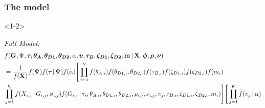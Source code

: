 \begin{frame}[b]
    \frametitle{The \msb model}
    \begin{onlyenv}<1-2>
    \begin{block}{\it Full Model:}
    {\tiny
    \begin{equation*}
        \begin{split}
        & f(\geneTreeVector,
        \numt{},
        \divtvector, \ancestralThetaVector,
        \descendantThetaVector{1}, \descendantThetaVector{2},
        \locusRateHetShapeParameter,
        \locusMutationRateScalarVector,
        \bottleTimeVector, \bottleScalarVector{1},
        \bottleScalarVector{2},
        \migrationRateVector \given
        \alignmentVector, \hkyModelVector, \ploidyScalarVector,
        \mutationRateScalarConstantVector) \\
        & = \frac{1}{f(\alignmentVector)}
        f(\numt{}) f(\divtvector \given \numt{})
        f(\locusRateHetShapeParameter)
        \Bigg[
        \prod_{i=1}^{\npairs{}}
        f(\ancestralTheta{i})
        f(\descendantTheta{1}{i}, \descendantTheta{2}{i})
        f(\bottleTime{i})
        f(\bottleScalar{1}{i}) f(\bottleScalar{2}{i})
        f(\migrationRate{i}) \\
        &
        \prod_{j=1}^{\nloci{i}}
        f(\alignment{i}{j} \given
        \geneTree{i}{j}, \hkyModel{i}{j})
        f(\geneTree{i}{j} \given
        \divt{i},
        \ancestralTheta{i}, \descendantTheta{1}{i}, \descendantTheta{2}{i},
        \ploidyScalar{i}{j}, \mutationRateScalarConstant{i}{j},
        \locusMutationRateScalar{j},
        \bottleTime{i}, \bottleScalar{1}{i}, \bottleScalar{2}{i},
        \migrationRate{i})
        \Bigg]
        \Bigg[
        \prod_{j=1}^{\nlociTotal}
        f(\locusMutationRateScalar{j} \given \locusRateHetShapeParameter)

\end{split}
\end{equation*}}
\end{block}
\end{onlyenv}
\end{frame}

